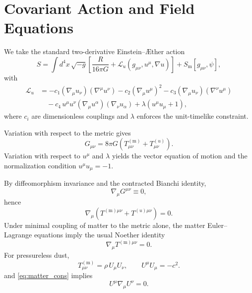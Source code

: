 \documentclass[12pt,a4paper]{article}
\newcommand{\AEther}{\AE{}ther}
\newcommand{\Sm}{S_{\mathrm{m}}}
\newcommand{\Tmm}{T^{(\mathrm{m})}_{\mu\nu}}
\newcommand{\Tuu}{T^{(u)}_{\mu\nu}}
\begin{document}
    \section{Covariant Action and Field Equations}
        \label{sec:action}
        
        We take the standard two-derivative Einstein--\AEther{} action
        \cite{jacobson2001,jacobson2008}
        \begin{equation}
        S = \int d^4x\,\sqrt{-g}\left[
        \frac{R}{16\pi G} + \mathcal{L}_u(g_{\mu\nu},u^\mu,\nabla u)
        \right] + \Sm[g_{\mu\nu},\psi],
        \label{eq:S}
        \end{equation}
        with
        \begin{align}
            \mathcal{L}_u
            &=
            -c_1 (\nabla_\mu u_\nu)(\nabla^\mu u^\nu)
            -c_2 (\nabla_\mu u^\mu)^2
            -c_3 (\nabla_\mu u_\nu)(\nabla^\nu u^\mu)
            \nonumber\\
            &\quad
            -c_4\, u^\mu u^\nu (\nabla_\mu u^\alpha)(\nabla_\nu u_\alpha)
            +\lambda(u^\mu u_\mu + 1),
            \label{eq:Lu}
        \end{align}
        where $c_i$ are dimensionless couplings and $\lambda$ enforces the unit-timelike
        constraint.
        
        Variation with respect to the metric gives
        \begin{equation}
            G_{\mu\nu}=8\pi G\left(\Tmm+\Tuu\right).
        \end{equation}
        Variation with respect to $u^\mu$ and $\lambda$ yields the vector equation of
        motion and the normalization condition $u^\mu u_\mu=-1$.
        
        By diffeomorphism invariance and the contracted Bianchi identity,
        \begin{equation}
            \nabla_\mu G^{\mu\nu}\equiv 0,
        \end{equation}
        hence
        \begin{equation}
            \nabla_\mu\left(T^{(\mathrm m)\mu\nu}+T^{(u)\mu\nu}\right)=0.
            \label{eq:total_cons}
        \end{equation}
        Under minimal coupling of matter to the metric alone, the matter Euler--Lagrange
        equations imply the usual Noether identity
        \begin{equation}
            \nabla_\mu T^{(\mathrm m)\mu\nu}=0.
            \label{eq:matter_cons}
        \end{equation}
        For pressureless dust,
        \begin{equation}
            T^{(\mathrm m)}_{\mu\nu} = \rho\, U_\mu U_\nu,
            \qquad
            U^\mu U_\mu = -c^2.
        \end{equation}
        and \cref{eq:matter_cons} implies
        \begin{equation}
            U^\mu \nabla_\mu U^\nu = 0.
        \end{equation}
\end{document}
